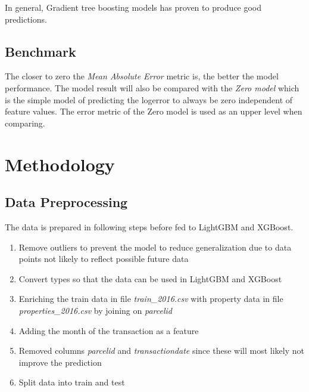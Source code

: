 \documentclass[a4paper]{article}
\begin{document}
In general, Gradient tree boosting models has proven to produce good predictions.

\subsection{Benchmark}
The closer to zero the \textit{Mean Absolute Error} metric is, the better the model performance. The model result will also be compared with the \textit{Zero model} which is the simple model of predicting the logerror to always be zero independent of feature values. The error metric of the Zero model is used as an upper level when comparing.


\section{Methodology}

\subsection{Data Preprocessing}
The data is prepared in following steps before fed to LightGBM and XGBoost.
\begin{enumerate}
    \item Remove outliers to prevent the model to reduce generalization due to data points not likely to reflect possible future data
    \item Convert types so that the data can be used in LightGBM and XGBoost
    \item Enriching the train data in file \textit{train\_2016.csv} with property data in file
        \textit{properties\_2016.csv} by joining on \textit{parcelid}
    \item Adding the month of the transaction as a feature
    \item Removed columns \textit{parcelid} and \textit{transactiondate} since these will most likely not improve the prediction
    \item Split data into train and test
\end{enumerate}
\end{document}
